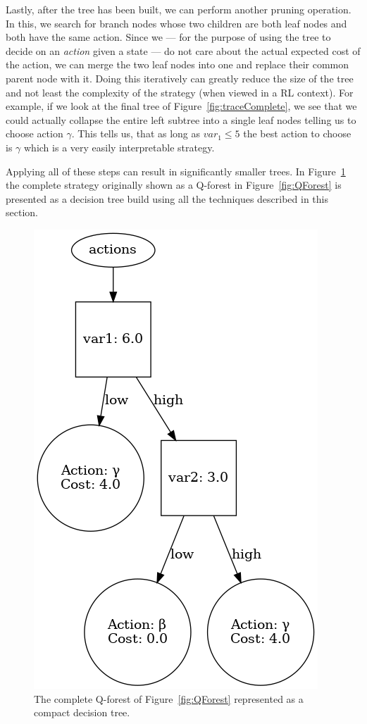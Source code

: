 \documentclass{article}
\begin{document}
Lastly, after the tree has been built, we can perform another pruning operation.
In this, we search for branch nodes whose two children are both leaf nodes and
both have the same action. Since we --- for the purpose of using the tree to
decide on an \textit{action} given a state --- do not care about the actual
expected cost of the action, we can merge the two leaf nodes into one and
replace their common parent node with it. Doing this iteratively can greatly
reduce the size of the tree and not least the complexity of the strategy (when
viewed in a RL context). For example, if we look at the final tree of
Figure~\ref{fig:traceComplete}, we see that we could actually collapse the
entire left subtree into a single leaf nodes telling us to choose action
$\gamma$. This tells us, that as long as $var_1 \leq 5$ the best action to
choose is $\gamma$ which is a very easily interpretable strategy.

Applying all of these steps can result in significantly smaller trees. In
Figure~\ref{fig:optimalExample} the complete strategy originally shown as a
Q-forest in Figure~\ref{fig:QForest} is presented as a decision tree build
using all the techniques described in this section.

\begin{figure}[ht]
    \centering
    \includegraphics[scale=0.4]{exampleOptimal}
    \caption{%
        The complete Q-forest of Figure~\ref{fig:QForest} represented as a
        compact decision tree.
    }\label{fig:optimalExample}
\end{figure}
\end{document}

